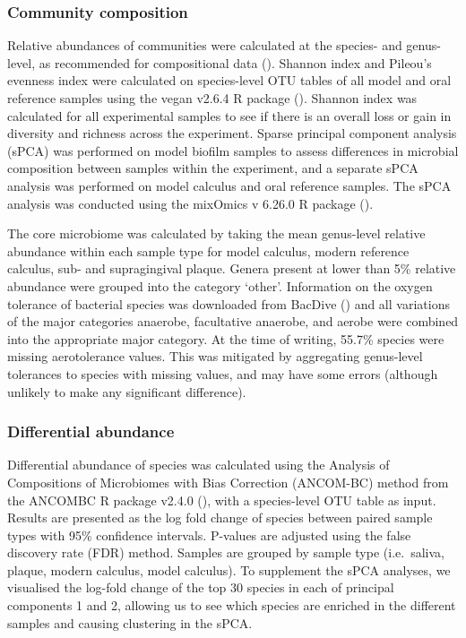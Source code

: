 \documentclass[
  b5paper,
]{book}
\begin{document}
\subsubsection{Community composition}\label{community-composition}

Relative abundances of communities were calculated at the species- and
genus-level, as recommended for compositional data
().
Shannon index and Pileou's evenness index were calculated on
species-level OTU tables of all model and oral reference samples using
the vegan v2.6.4 R package (). Shannon index was calculated for all experimental samples to see
if there is an overall loss or gain in diversity and richness across the
experiment. Sparse principal component analysis (sPCA) was performed on
model biofilm samples to assess differences in microbial composition
between samples within the experiment, and a separate sPCA analysis was
performed on model calculus and oral reference samples. The sPCA
analysis was conducted using the mixOmics v 6.26.0 R package
().

The core microbiome was calculated by taking the mean genus-level
relative abundance within each sample type for model calculus, modern
reference calculus, sub- and supragingival plaque. Genera present at
lower than 5\% relative abundance were grouped into the category
`other'. Information on the oxygen tolerance of bacterial species was
downloaded from BacDive () and all variations of the major categories anaerobe, facultative
anaerobe, and aerobe were combined into the appropriate major category.
At the time of writing, 55.7\% species were missing aerotolerance
values. This was mitigated by aggregating genus-level tolerances to
species with missing values, and may have some errors (although unlikely
to make any significant difference).

\subsubsection{Differential abundance}\label{differential-abundance}

Differential abundance of species was calculated using the Analysis of
Compositions of Microbiomes with Bias Correction (ANCOM-BC) method from
the ANCOMBC R package v2.4.0 (), with a species-level OTU table as input. Results are
presented as the log fold change of species between paired sample types
with 95\% confidence intervals. P-values are adjusted using the false
discovery rate (FDR) method. Samples are grouped by sample type
(i.e.~saliva, plaque, modern calculus, model calculus). To supplement
the sPCA analyses, we visualised the log-fold change of the top 30
species in each of principal components 1 and 2, allowing us to see
which species are enriched in the different samples and causing
clustering in the sPCA.
\end{document}
